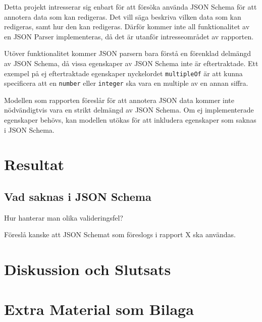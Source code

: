\documentclass[swedish]{kththesis}
\begin{document}
Detta projekt intresserar sig enbart för att försöka använda JSON Schema för att annotera data som kan redigeras. Det vill säga beskriva vilken data som kan redigeras, samt hur den kan redigeras. Därför kommer inte all funktionalitet av en JSON Parser implementeras, då det är utanför intresseområdet av rapporten.

Utöver funktionalitet kommer JSON parsern bara förstå en förenklad delmängd av JSON Schema, då vissa egenskaper av JSON Schema inte är eftertraktade. Ett exempel på ej eftertraktade egenskaper nyckelordet \texttt{multipleOf} är att kunna specificera att en \texttt{number} eller \texttt{integer} ska vara en multiple av en annan siffra.

Modellen som rapporten föreslår för att annotera JSON data kommer inte nödvändigtvis vara en strikt delmängd av JSON Schema. Om ej implementerade egenskaper behövs, kan modellen utökas för att inkludera egenskaper som saknas i JSON Schema.

\chapter{Resultat}

\section{Vad saknas i JSON Schema}
Hur hanterar man olika valideringsfel?

Föreslå kanske att JSON Schemat som föreslogs i rapport X ska användas.

\chapter{Diskussion och Slutsats}

\printbibliography[heading=bibintoc] %

\appendix

\chapter{Extra Material som Bilaga}
\end{document}
